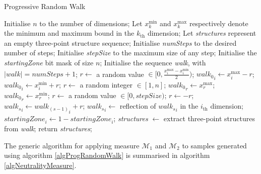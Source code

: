 \documentclass[conference]{IEEEtran}
\begin{document}
\begin{algorithm}[!t]
	\caption{Progressive Random Walk}
	\label{algProgRandomWalk}
	\begin{algorithmic}
		\STATE Initialise $n$ to the number of dimensions;
		\STATE Let $x_k^{\text{min}}$ and $x_k^{\text{max}}$ respectively denote the minimum and maximum bound in the $k_{\text{th}}$ dimension;
		\STATE Let \textit{structures} represent an empty three-point structure sequence;
		\STATE Initialise \textit{numSteps} to the desired number of steps;
		\STATE Initialise \textit{stepSize} to the maximum size of any step;
		\STATE Initialise the \textit{startingZone} bit mask of size $n$; 
		\STATE Initialise the sequence \textit{walk}, with $\lvert \textit{walk} \rvert = \textit{numSteps} + 1$;
			\STATE	$r \gets$ a random value $\in [0, \frac{x_i^{\text{max}} - x_i^{\text{min}}}{2})$;	
				\STATE ${{\textit{walk}}_0}_i \gets x_i^{\text{max}} - r$;
			\ELSE
				\STATE ${{\textit{walk}}_0}_i \gets x_i^{\text{min}} + r$;
			\ENDIF			
		\ENDFOR
		\STATE $r \gets$ a random integer $\in [1,n]$;
			\STATE ${{\textit{walk}}_0}_{r} \gets x_{r}^{\text{max}}$;
		\ELSE
			\STATE ${{\textit{walk}}_0}_{r} \gets x_{r}^{\text{min}}$;
		\ENDIF	
				\STATE	$r \gets$ a random value $\in [0, \textit{stepSize})$;	
					\STATE $r \gets -r$;				
				\ENDIF			
				\STATE ${{\textit{walk}}_s}_i \gets {{\textit{walk}}_{(s-1)}}_i + r$;
					\STATE ${{\textit{walk}}_s}_i \gets$ reflection of ${{\textit{walk}}_s}_i$ in the $i_{\text{th}}$ dimension;
					\STATE ${\textit{startingZone}}_i \gets 1 - {\textit{startingZone}}_i$;
				\ENDIF
			\ENDFOR	
		\ENDFOR
		\STATE \textit{structures} $\gets$ extract three-point structures from \textit{walk};
		\STATE return \textit{structures};
	\end{algorithmic}	
\end{algorithm} 

The generic algorithm for applying measure ${\mathcal{M}_1}$ and ${\mathcal{M}_2}$ to samples generated using algorithm \ref{algProgRandomWalk} is summarised in algorithm \ref{algNeutralityMeasure}.
\end{document}
